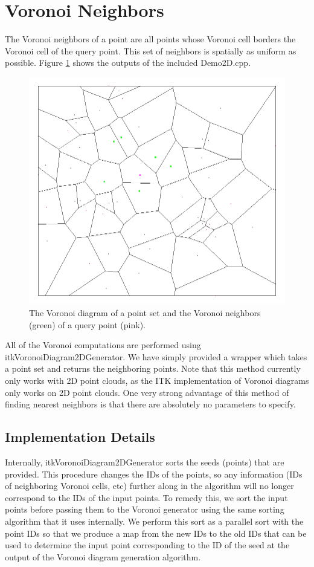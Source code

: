 \documentclass{InsightArticle}
\begin{document}
\section{Voronoi Neighbors}
The Voronoi neighbors of a point are all points whose Voronoi cell borders the Voronoi cell of the query point. This set of neighbors is spatially as uniform as possible. Figure \ref{fig:Voronoi} shows the outputs of the included Demo2D.cpp.

\begin{figure}[H]
  \centering
  \includegraphics[width=0.7\linewidth]{images/Voronoi}
  \caption{The Voronoi diagram of a point set and the Voronoi neighbors (green) of a query point (pink).}
  \label{fig:Voronoi}
\end{figure}

All of the Voronoi computations are performed using itkVoronoiDiagram2DGenerator. We have simply provided a wrapper which takes a point set and returns the neighboring points. Note that this method currently only works with 2D point clouds, as the ITK implementation of Voronoi diagrams only works on 2D point clouds. One very strong advantage of this method of finding nearest neighbors is that there are absolutely no parameters to specify.

\subsection{Implementation Details}
Internally, itkVoronoiDiagram2DGenerator sorts the seeds (points) that are provided. This procedure changes the IDs of the points, so any information (IDs of neighboring Voronoi cells, etc) further along in the algorithm will no longer correspond to the IDs of the input points. To remedy this, we sort the input points before passing them to the Voronoi generator using the same sorting algorithm that it uses internally. We perform this sort as a parallel sort with the point IDs so that we produce a map from the new IDs to the old IDs that can be used to determine the input point corresponding to the ID of the seed at the output of the Voronoi diagram generation algorithm.
\end{document}
